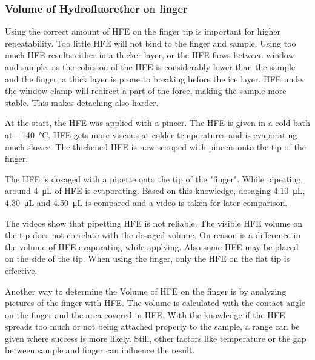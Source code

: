 \subsubsection{Volume of Hydrofluorether on finger}


Using the correct amount of HFE on the finger tip is important for higher repeatability. Too little HFE will not bind to the finger and sample. Using too much HFE results either in a thicker layer, or the HFE flows between window and sample. as the cohesion of the HFE is considerably lower than the sample and the finger, a thick layer is prone to breaking before the ice layer. HFE under the window clamp will redirect a part of the force, making the sample more stable. This makes detaching also harder.

At the start, the HFE was applied with a pincer. The HFE is given in a cold bath at \SI{-140}{\degreeCelsius}. HFE gets more viscous at colder temperatures and is evaporating much slower. The thickened HFE is now scooped with pincers onto the tip of the finger.


The HFE is dosaged with a pipette onto the tip of the "finger". While pipetting, around \SI{4}{\micro\liter} of HFE is evaporating. Based on this knowledge, dosaging \SI{4.10}{\micro\liter}, \SI{4.30}{\micro\liter} and \SI{4.50}{\micro\liter} is compared and a video is taken for later comparison.

The videos show that pipetting HFE is not reliable. The visible HFE volume on the tip does not correlate with the dosaged volume. On reason is a difference in the volume of HFE evaporating while applying. Also some HFE may be placed on the side of the tip. When using the finger, only the HFE on the flat tip is effective.

Another way to determine the Volume of HFE on the finger is by analyzing pictures of the finger with HFE. The volume is calculated with the contact angle on the finger and the area covered in HFE. With the knowledge if the HFE spreads too much or not being attached properly to the sample, a range can be given where success is more likely. Still, other factors like temperature or the gap between sample and finger can influence the result.

